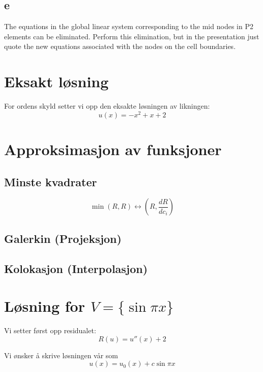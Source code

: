 \documentclass[a4paper, 10pt]{article}
\begin{document}
\subsection*{e} The equations in the global linear system corresponding to the mid nodes in P2 elements can be eliminated. Perform this elimination, but in the presentation just quote the new equations associated with the nodes on the cell boundaries. 

\section{Eksakt løsning}
For ordens skyld setter vi opp den eksakte løsningen av likningen:
\begin{equation}
	u(x) = -x^2 + x + 2
\end{equation}

\section{Approksimasjon av funksjoner}

\subsection{Minste kvadrater}
\begin{equation}
	\min{(R, R)} \leftrightarrow \left( R, \frac{dR}{dc_i}\right)
\end{equation}

\subsection{Galerkin (Projeksjon)}

\subsection{Kolokasjon (Interpolasjon)}

\section{Løsning for $V = \{\sin \pi x\}$}

Vi setter først opp residualet:
\begin{equation}
	R(u) = u''(x) +2
\end{equation}

Vi ønsker å skrive løsningen vår som
\begin{equation}
	u(x) = u_0(x) + c\sin{\pi x}
\end{equation}
\end{document}
